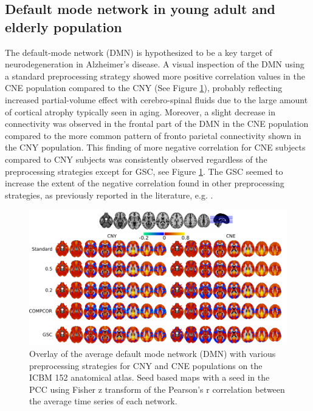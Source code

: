\subsection{Default mode network in young adult and elderly population}
The default-mode network (DMN) is hypothesized to be a key target of neurodegeneration in Alzheimer's disease. A visual inspection of the DMN using a standard preprocessing strategy showed more positive correlation values in the CNE population compared to the CNY (See Figure \ref{fig_avg_dmn}), probably reflecting increased partial-volume effect with cerebro-spinal fluids due to the large amount of cortical atrophy typically seen in aging. Moreover, a slight decrease in connectivity was observed in the frontal part of the DMN in the CNE population compared to the more common pattern of fronto parietal connectivity shown in the CNY population. This finding of more negative correlation for CNE subjects compared to CNY subjects was consistently observed regardless of the preprocessing strategies except for GSC, see Figure \ref{fig_avg_dmn}. The GSC seemed to increase the extent of the negative correlation found in other preprocessing strategies, as previously reported in the literature, e.g. \citep{Murphy2009}.


\begin{figure}[H]
\begin{center}
\includegraphics[width=\linewidth]{../figures/dmn_cny_cne.pdf}
\end{center}
\caption[Preprocessing impact on DMN for CNY and CNE]{ Overlay of the average default mode network (DMN) with various preprocessing strategies for CNY and CNE populations on the ICBM 152 anatomical atlas. Seed based maps with a seed in the PCC using Fisher z transform of the Pearson's r correlation between the average time series of each network.
}
\label{fig_avg_dmn}
\end{figure}

